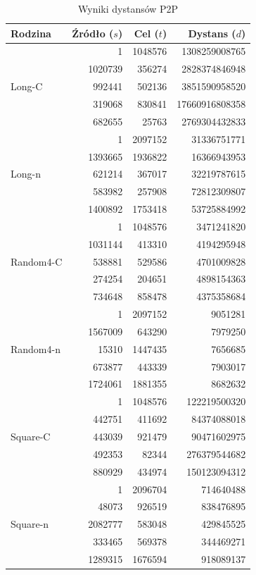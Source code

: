 \documentclass[11pt, a4paper]{article}
\begin{document}
\begin{table}[h!]
	\centering
	\caption{Wyniki dystansów P2P}
	\label{tab:radix_p2p_synthetic}
	\vspace{0.2cm}
	\begin{tabular}{lrrr}
		\toprule
		\textbf{Rodzina} & \textbf{Źródło ($s$)} & \textbf{Cel ($t$)} & \textbf{Dystans ($d$)} \\
		\midrule
		\multirow{5}{*}{Long-C} 
		& 1 & 1048576 & 1308259008765 \\
		& 1020739 & 356274 & 2828374846948 \\
		& 992441 & 502136 & 3851590958520 \\
		& 319068 & 830841 & 17660916808358 \\
		& 682655 & 25763 & 2769304432833 \\
		\midrule
		\multirow{5}{*}{Long-n} 
		& 1 & 2097152 & 31336751771 \\
		& 1393665 & 1936822 & 16366943953 \\
		& 621214 & 367017 & 32219787615 \\
		& 583982 & 257908 & 72812309807 \\
		& 1400892 & 1753418 & 53725884992 \\
		\midrule
		\multirow{5}{*}{Random4-C} 
		& 1 & 1048576 & 3471241820 \\
		& 1031144 & 413310 & 4194295948 \\
		& 538881 & 529586 & 4701009828 \\
		& 274254 & 204651 & 4898154363 \\
		& 734648 & 858478 & 4375358684 \\
		\midrule
		\multirow{5}{*}{Random4-n} 
		& 1 & 2097152 & 9051281 \\
		& 1567009 & 643290 & 7979250 \\
		& 15310 & 1447435 & 7656685 \\
		& 673877 & 443339 & 7903017 \\
		& 1724061 & 1881355 & 8682632 \\
		\midrule
		\multirow{5}{*}{Square-C} 
		& 1 & 1048576 & 122219500320 \\
		& 442751 & 411692 & 84374088018 \\
		& 443039 & 921479 & 90471602975 \\
		& 492353 & 82344 & 276379544682 \\
		& 880929 & 434974 & 150123094312 \\
		\midrule
		\multirow{5}{*}{Square-n} 
		& 1 & 2096704 & 714640488 \\
		& 48073 & 926519 & 838476895 \\
		& 2082777 & 583048 & 429845525 \\
		& 333465 & 569378 & 344469271 \\
		& 1289315 & 1676594 & 918089137 \\
		\bottomrule
	\end{tabular}
\end{table}
\end{document}
